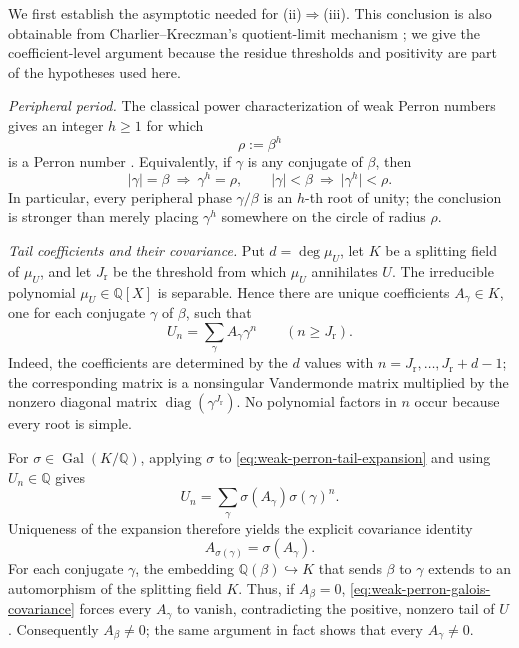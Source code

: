   We first establish the asymptotic needed for
  \textup{(ii)}\(\Rightarrow\)\textup{(iii)}. This conclusion is also
  obtainable from Charlier--Kreczman's quotient-limit mechanism
  \cite[Proposition~10 and Remark~12]{CharlierKreczman2025}; we give the
  coefficient-level argument because the residue thresholds and positivity
  are part of the hypotheses used here.

  \emph{Peripheral period.}
  The classical power characterization of weak Perron numbers gives an
  integer \(h\ge1\) for which
  \[
    \rho:=\beta^h
  \]
  is a Perron number \cite{Brunotte2013,Lind1984}. Equivalently, if
  \(\gamma\) is any conjugate of \(\beta\), then
  \[
    \lvert\gamma\rvert=\beta\ \Longrightarrow\ \gamma^h=\rho,
    \qquad
    \lvert\gamma\rvert<\beta\ \Longrightarrow\
      \lvert\gamma^h\rvert<\rho.
  \]
  In particular, every peripheral phase \(\gamma/\beta\) is an
  \(h\)-th root of unity; the conclusion is stronger than merely placing
  \(\gamma^h\) somewhere on the circle of radius \(\rho\).

  \emph{Tail coefficients and their covariance.}
  Put \(d=\deg\mu_U\), let \(K\) be a splitting field of \(\mu_U\), and
  let \(J_{\mathrm r}\) be the threshold from which \(\mu_U\) annihilates
  \(U\). The irreducible polynomial \(\mu_U\in\mathbb Q[X]\) is
  separable. Hence there are unique coefficients \(A_\gamma\in K\), one
  for each conjugate \(\gamma\) of \(\beta\), such that
  \begin{equation}
    U_n=\sum_\gamma A_\gamma\gamma^n
    \qquad(n\ge J_{\mathrm r}).
    \label{eq:weak-perron-tail-expansion}
  \end{equation}
  Indeed, the coefficients are determined by the \(d\) values with
  \(n=J_{\mathrm r},\ldots,J_{\mathrm r}+d-1\); the corresponding matrix
  is a nonsingular Vandermonde matrix multiplied by the nonzero diagonal
  matrix \(\operatorname{diag}(\gamma^{J_{\mathrm r}})\). No polynomial
  factors in \(n\) occur because every root is simple.

  For \(\sigma\in\operatorname{Gal}(K/\mathbb Q)\), applying \(\sigma\)
  to \eqref{eq:weak-perron-tail-expansion} and using
  \(U_n\in\mathbb Q\) gives
  \[
    U_n=\sum_\gamma \sigma(A_\gamma)\sigma(\gamma)^n.
  \]
  Uniqueness of the expansion therefore yields the explicit covariance
  identity
  \begin{equation}
    A_{\sigma(\gamma)}=\sigma(A_\gamma).
    \label{eq:weak-perron-galois-covariance}
  \end{equation}
  For each conjugate \(\gamma\), the embedding
  \(\mathbb Q(\beta)\hookrightarrow K\) that sends \(\beta\) to
  \(\gamma\) extends to an automorphism of the splitting field \(K\).
  Thus, if \(A_\beta=0\),
  \eqref{eq:weak-perron-galois-covariance} forces every \(A_\gamma\) to vanish,
  contradicting the positive, nonzero tail of \(U\). Consequently
  \(A_\beta\ne0\); the same argument in fact shows that every
  \(A_\gamma\ne0\).


